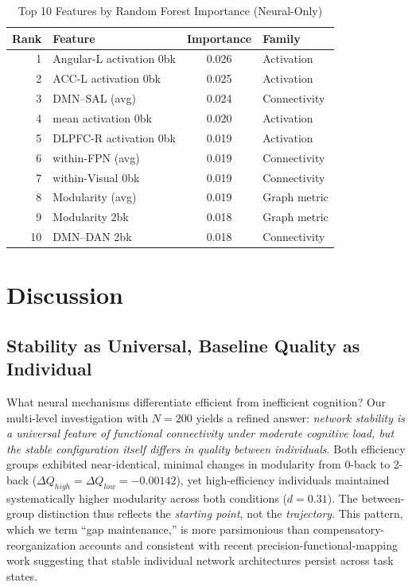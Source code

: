 \documentclass[conference]{IEEEtran}
\begin{document}
\begin{table}[t]
\caption{Top 10 Features by Random Forest Importance (Neural-Only)}
\label{tab:featimp}
\centering
\footnotesize
\setlength{\tabcolsep}{6pt}
\begin{tabular}{@{}r l c l@{}}
\toprule
\textbf{Rank} & \textbf{Feature} & \textbf{Importance} & \textbf{Family} \\
\midrule
1  & Angular-L activation 0bk     & 0.026 & Activation \\
2  & ACC-L activation 0bk         & 0.025 & Activation \\
3  & DMN--SAL (avg)               & 0.024 & Connectivity \\
4  & mean activation 0bk          & 0.020 & Activation \\
5  & DLPFC-R activation 0bk       & 0.019 & Activation \\
6  & within-FPN (avg)             & 0.019 & Connectivity \\
7  & within-Visual 0bk            & 0.019 & Connectivity \\
8  & Modularity (avg)             & 0.019 & Graph metric \\
9  & Modularity 2bk               & 0.018 & Graph metric \\
10 & DMN--DAN 2bk                 & 0.018 & Connectivity \\
\bottomrule
\end{tabular}
\end{table}

\section{Discussion}

\subsection{Stability as Universal, Baseline Quality as Individual}

What neural mechanisms differentiate efficient from inefficient cognition? Our multi-level investigation with $N=200$ yields a refined answer: \emph{network stability is a universal feature of functional connectivity under moderate cognitive load, but the stable configuration itself differs in quality between individuals}. Both efficiency groups exhibited near-identical, minimal changes in modularity from 0-back to 2-back ($\Delta Q_{high}=\Delta Q_{low}=-0.00142$), yet high-efficiency individuals maintained systematically higher modularity across both conditions ($d=0.31$). The between-group distinction thus reflects the \emph{starting point}, not the \emph{trajectory}. This pattern, which we term ``gap maintenance,'' is more parsimonious than compensatory-reorganization accounts and consistent with recent precision-functional-mapping work suggesting that stable individual network architectures persist across task states.
\end{document}
